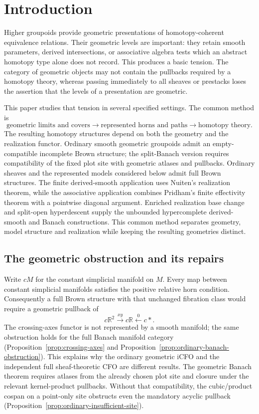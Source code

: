 \documentclass[12pt]{amsart}
\theoremstyle{definition}
\theoremstyle{remark}
\numberwithin{equation}{section}
\newcommand{\R}{\mathbb R}
\begin{document}
\section{Introduction}
\label{sec:introduction}

Higher groupoids provide geometric presentations of
homotopy-coherent equivalence relations. Their geometric
levels are important: they retain smooth parameters,
derived intersections, or associative algebra tests
which an abstract homotopy type alone does not record.
This produces a basic tension. The category of geometric
objects may not contain the pullbacks required by a
homotopy theory, whereas passing immediately to all
sheaves or prestacks loses the assertion that the
levels of a presentation are geometric.

This paper studies that tension in several specified settings.
The common method is
\[
 \text{geometric limits and covers}
 \longrightarrow
 \text{represented horns and paths}
 \longrightarrow
 \text{homotopy theory}.
\]
The resulting homotopy structures depend on both the geometry
and the realization functor. Ordinary smooth geometric groupoids
admit an empty-compatible incomplete Brown structure; the
split-Banach version requires compatibility of the fixed
plot site with geometric atlases and pullbacks. Ordinary
sheaves and the represented models considered below admit
full Brown structures. The finite derived-smooth application
uses Nuiten's realization theorem, while the associative
application combines Pridham's finite effectivity theorem
with a pointwise diagonal argument. Enriched realization
base change and split-open hyperdescent supply the
unbounded hypercomplete derived-smooth and Banach
constructions. This common method separates geometry,
model structure and realization while keeping the
resulting geometries distinct.

\subsection{The geometric obstruction and its repairs}

Write $cM$ for the constant simplicial manifold on $M$.
Every map between constant simplicial manifolds satisfies the
positive relative horn condition. Consequently a full Brown
structure with that unchanged fibration class would require a
geometric pullback of
\[
 c\R^2\xrightarrow{xy}c\R\xleftarrow{0}c*.
\]
The crossing-axes functor is not represented by a
smooth manifold; the same obstruction holds for
the full Banach manifold category
(Proposition~\ref{prop:crossing-axes} and
Proposition~\ref{prop:ordinary-banach-obstruction}).
This explains why the ordinary geometric iCFO
and the independent full sheaf-theoretic CFO
are different results.
The geometric Banach theorem requires atlases from the
already chosen plot site and closure under the relevant
kernel-product pullbacks. Without that compatibility,
the cubic/product cospan on a point-only site obstructs
even the mandatory acyclic pullback
(Proposition~\ref{prop:ordinary-insufficient-site}).
\end{document}

